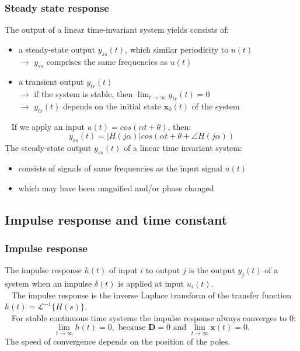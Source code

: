 \begin{frame}
\frametitle{Steady state response}
The output of a linear time-invariant system yields consists of:
\begin{itemize}
\item a steady-state output $y_{ss}(t)$, which similar periodicity to $u(t)$ \\
$\rightarrow$ $y_{ss}$ comprises the same frequencies as $u(t)$ \\
\item a transient output $y_{tr}(t)$ \\
$\rightarrow$ if the system is stable, then $\lim_{t\rightarrow\infty} y_{tr}(t) = 0$  \\
$\rightarrow$ $y_{tr}(t)$ depends on the initial state $\mathbf{x}_0(t)$ of the system
\end{itemize}
\pause
\ \newline
If we apply an input $u(t) = cos(\alpha t + \theta)$, then:
\begin{equation*}
y_{ss}(t) = |H(j\alpha)|cos(\alpha t + \theta + \angle H(j\alpha))
\end{equation*}
\pause
The steady-state output $y_{ss}(t)$ of a linear time invariant system:
\begin{itemize}
\item consists of signals of same frequencies as the input signal $u(t)$
\item which may have been magnified and/or phase changed
\end{itemize}
\end{frame}

\subsection{Impulse response and time constant}

\begin{frame}
\frametitle{Impulse response}
The impulse response $h(t)$ of input $i$ to output $j$ is the output $y_j(t)$ of a system when an impulse $\delta(t)$ is applied at input $u_i(t)$.\\
\ \newline
\pause
The impulse response is the inverse Laplace transform of the transfer function $h(t) = \mathcal{L}^{-1}\{H(s)\}$.\\ 
\ \newline
\pause
For stable continuous time systems the impulse response always converges to $0$:
\begin{equation*}
\lim_{t\rightarrow\infty} h(t) = 0, \text{ because } \mathbf{D}=0 \text{ and }\lim_{t\rightarrow\infty} \mathbf{x}(t) = 0.
\end{equation*}
\pause
The speed of convergence depends on the position of the poles.
\end{frame}

